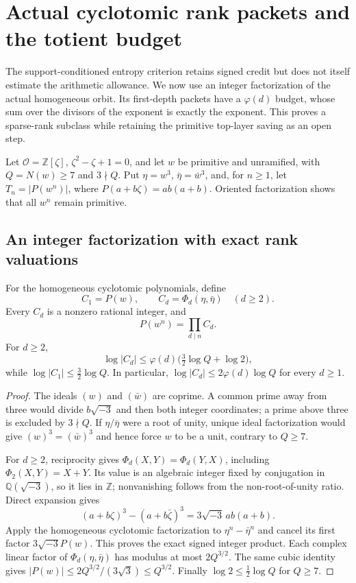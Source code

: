 \section{Actual cyclotomic rank packets and the totient budget}
\label{cp-section}
The support-conditioned entropy criterion retains signed credit but
does not itself estimate the arithmetic allowance. We now use an
integer factorization of the actual homogeneous orbit. Its first-depth
packets have a $\varphi(d)$ budget, whose sum over the divisors of the
exponent is exactly the exponent. This proves a sparse-rank subclass
while retaining the primitive top-layer saving as an open step.

Let $\mathcal O=\mathbb Z[\zeta]$, $\zeta^2-\zeta+1=0$, and let $w$
be primitive and unramified, with $Q=N(w)\ge7$ and $3\nmid Q$.
Put $\eta=w^3$, $\bar\eta=\bar w^3$, and, for $n\ge1$, let
$T_n=|P(w^n)|$, where $P(a+b\zeta)=ab(a+b)$.
Oriented factorization shows that all $w^n$ remain primitive.

\subsection{An integer factorization with exact rank valuations}
\begin{theorem}\label{cp-integers}
For the homogeneous cyclotomic polynomials, define
\[
 C_1=P(w),\qquad C_d=\Phi_d(\eta,\bar\eta)\quad(d\ge2).
\]
Every $C_d$ is a nonzero rational integer, and
\[
 P(w^n)=\prod_{d\mid n}C_d.
\]
For $d\ge2$,
\[
 \log|C_d|\le\varphi(d)\bigl(\tfrac32\log Q+\log2\bigr),
\]
while $\log|C_1|\le\tfrac32\log Q$. In particular,
$\log|C_d|\le2\varphi(d)\log Q$ for every $d\ge1$.
\end{theorem}
\begin{proof}
The ideals $(w)$ and $(\bar w)$ are coprime. A common prime away from
three would divide $b\sqrt{-3}$ and then both integer coordinates;
a prime above three is excluded by $3\nmid Q$. If
$\eta/\bar\eta$ were a root of unity, unique ideal factorization
would give $(w)^3=(\bar w)^3$ and hence force $w$ to be a unit,
contrary to $Q\ge7$.

For $d\ge2$, reciprocity gives
$\Phi_d(X,Y)=\Phi_d(Y,X)$, including $\Phi_2(X,Y)=X+Y$.
Its value is an algebraic integer fixed by conjugation in
$\mathbb Q(\sqrt{-3})$, so it lies in $\mathbb Z$; nonvanishing
follows from the non-root-of-unity ratio. Direct expansion gives
\[
 (a+b\zeta)^3-(a+b\bar\zeta)^3
       =3\sqrt{-3}\,ab(a+b).
\]
Apply the homogeneous cyclotomic factorization to
$\eta^n-\bar\eta^n$ and cancel its first factor
$3\sqrt{-3}P(w)$. This proves the exact signed integer product.
Each complex linear factor of $\Phi_d(\eta,\bar\eta)$ has modulus
at most $2Q^{3/2}$. The same cubic identity gives
$|P(w)|\le2Q^{3/2}/(3\sqrt3)\le Q^{3/2}$.
Finally $\log2\le\tfrac12\log Q$ for $Q\ge7$.
\end{proof}

